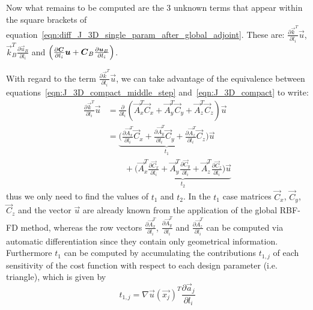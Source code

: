 Now what remains to be computed are the $3$ unknown terms that appear within the square brackets of equation~\eqref{eqn:diff_J_3D_single_param_after_global_adjoint}. These are: $\frac{\partial \vec{k}^T}{\partial l_i}\vec{u}$, $\vec{k}_B^T \frac{\partial \vec{u}_B}{\partial l_i}$ and $\Bigl( \frac{\partial \vec{C}}{\partial l_i}\vec{u} + \vec{C}_B\frac{\partial \vec{u}_B}{\partial l_i} \Bigr)$.

\medskip
With regard to the term $\frac{\partial \vec{k}^T}{\partial l_i}\vec{u}$, we can take advantage of the equivalence between equations~\eqref{eqn:J_3D_compact_middle_step} and~\eqref{eqn:J_3D_compact} to write:
\begin{equation}
	\begin{split}
		\frac{\partial \vec{k}^T}{\partial l_i}\vec{u} & = \frac{\partial}{\partial l_i} (\vec{A}_x^T\vec{C}_x + \vec{A}_y^T\vec{C}_y + \vec{A}_z^T\vec{C}_z) \vec{u}  \\
													   & = \underbrace{\biggl( \frac{\partial \vec{A}_x^T}{\partial l_i}\vec{C}_x + \frac{\partial \vec{A}_y^T}{\partial l_i}\vec{C}_y + \frac{\partial \vec{A}_z^T}{\partial l_i}\vec{C}_z \biggr) \vec{u}}_{t_1}  \\
													   &\qquad + \underbrace{\biggl( \vec{A}_x^T\frac{\partial \vec{C}_x}{\partial l_i} + \vec{A}_y^T\frac{\partial \vec{C}_y}{\partial l_i} + \vec{A}_z^T\frac{\partial \vec{C}_z}{\partial l_i}\biggr) \vec{u}}_{t_2}
	\end{split}
\end{equation}
thus we only need to find the values of $t_1$ and $t_2$.
In the $t_1$ case matrices $\vec{C}_x$, $\vec{C}_y$, $\vec{C}_z$ and the vector $\vec{u}$ are already known from the application of the global RBF-FD method, whereas the row vectors $\frac{\partial \vec{A}_x^T}{\partial l_i}$, $\frac{\partial \vec{A}_y^T}{\partial l_i}$ and $\frac{\partial \vec{A}_z^T}{\partial l_i}$ can be computed via automatic differentiation since they contain only geometrical information.
Furthermore $t_1$ can be computed by accumulating the contributions $t_{1,j}$ of each sensitivity of the cost function with respect to each design parameter (i.e. triangle), which is given by
\begin{equation}
	t_{1,j} = \nabla\vec{u}(\vec{x_j})^T \frac{\partial \vec{a}_j}{\partial l_i}	
\end{equation}

